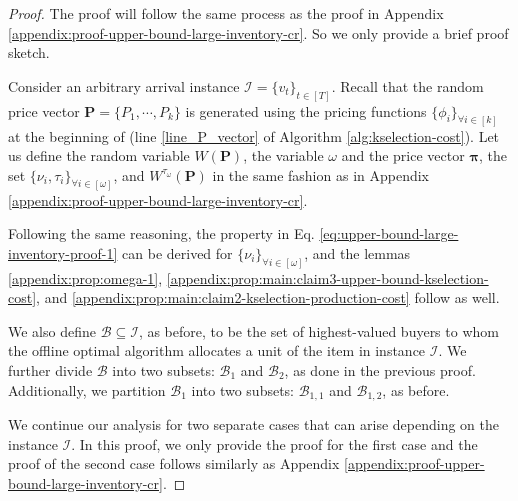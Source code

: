 \begin{proof}
The proof will follow the same process as the proof in Appendix \ref{appendix:proof-upper-bound-large-inventory-cr}. So we only provide a brief proof sketch.

Consider an arbitrary arrival instance  $\mathcal{I} = \{v_{t}\}_{t \in [T]}$. Recall that the random price vector $\mathbf{P} = \{P_1, \cdots, P_k\} $ is generated using the pricing functions $\{\phi_{i}\}_{\forall i \in [k]}$ at the beginning of \rDynamic (line \ref{line_P_vector} of Algorithm \ref{alg:kselection-cost}). Let us define the random variable $W(\mathbf{P})$, the variable $\omega$ and the price vector $\boldsymbol{\pi}$, the set $\{\nu_{i}, \tau_{i}\}_{\forall i \in [\omega]}$, and $W^{\tau_{\omega}}(\mathbf{P})$ in the same fashion as in Appendix \ref{appendix:proof-upper-bound-large-inventory-cr}.

Following the same reasoning, the property in Eq. \eqref{eq:upper-bound-large-inventory-proof-1} can be derived for $\{\nu_{i}\}_{\forall i \in [\omega]}$, and the lemmas \ref{appendix:prop:omega-1}, \ref{appendix:prop:main:claim3-upper-bound-kselection-cost}, and \ref{appendix:prop:main:claim2-kselection-production-cost} follow as well.

We also define $\mathcal{B} \subseteq \mathcal{I}$, as before, to be the set of highest-valued buyers to whom the offline optimal algorithm allocates a unit of the item in instance $\mathcal{I}$. We further divide $\mathcal{B}$ into two subsets: $\mathcal{B}_{1}$ and $\mathcal{B}_{2}$, as done in the previous proof. Additionally, we partition $\mathcal{B}_{1}$ into two subsets: $\mathcal{B}_{1,1}$ and $\mathcal{B}_{1,2}$, as before.


We continue our analysis for two separate cases that can arise depending on the instance $\mathcal{I}$. In this proof, we only provide the proof for the first case and the proof of the second case follows similarly as Appendix \ref{appendix:proof-upper-bound-large-inventory-cr}.


\end{proof}
